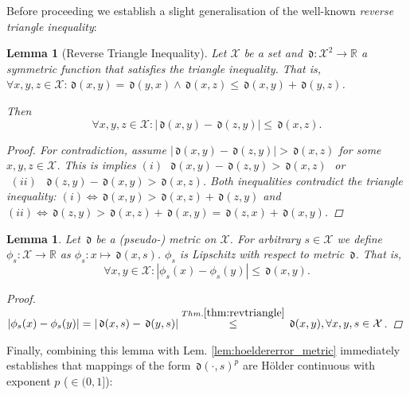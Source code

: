 \documentclass{article} %
\newtheorem{lem}[thm]{Lemma}
\theoremstyle{definition}
\theoremstyle{remark}
\newcommand{\abs}[1]{\left\vert#1\right\vert}
\newcommand{\Real}{\mathbb R}
\newcommand{\inspace}{\ensuremath{ \mathcal X}}
\newcommand{\metric}{\, \mathfrak{d}} %
\begin{document}
Before proceeding we establish a slight generalisation of the well-known \textit{reverse triangle inequality}:

\begin{lem}[Reverse Triangle Inequality] \label{thm:revtriangle}
Let  $\inspace$ be a set and $\metric : \inspace^2 \to \Real$ a symmetric function that satisfies the triangle inequality. 
That is,  $\forall x,y,z \in \inspace: \metric (x,y) = \metric(y,x) \wedge \metric(x,z) \leq \metric(x,y) + \metric(y,z)$.

Then \[\forall x,y,z \in \inspace: \abs{\metric(x,y) - \metric(z,y)} \leq \metric(x,z).\]
\begin{proof}
For contradiction, assume 
$\abs{\metric(x,y) - \metric(z,y)}>\metric(x,z)$ for some $x,y,z \in \inspace$.
This is implies  
$
(i)\,\,\, \metric(x,y) - \metric(z,y)>\metric(x,z) 
\, \, $  or  $
\,\,  (ii) \,\,\,\, \metric(z,y)-\metric(x,y) >\metric(x,z)$.
Both inequalities contradict the triangle inequality:
$(i) \Leftrightarrow \metric(x,y)  >\metric(x,z) +\metric(z,y) $ and 
$(ii) \Leftrightarrow  \metric(z,y) > \metric(x,z) + \metric(x,y) =  \metric(z,x) + \metric(x,y)$.

\end{proof}
\end{lem}


\begin{lem}
Let $\metric$ be a (pseudo-) metric on $\inspace$. For arbitrary $s \in \inspace $ we define $\phi_s: \inspace \to \Real $ as $\phi_s: x \mapsto \metric (x,s) $.
$\phi_s $ is Lipschitz with respect to metric $\metric$. That is, \[\forall x,y \in \inspace : \abs{\phi_s(x) - \phi_s(y) } \leq \metric (x,y). \]
\begin{proof}
$\abs{\phi_s(x) - \phi_s(y)} = \abs{\metric(x,s) - \metric(y,s)} \stackrel{Thm. \ref{thm:revtriangle}} {\leq} \metric(x,y), \forall x,y,s \in \inspace $.
\end{proof}
\end{lem}
Finally, combining this lemma with Lem. \ref{lem:hoeldererror_metric} immediately establishes that mappings of the form $\metric(\cdot,s)^p$ are H\"older continuous with exponent $p$ ($\in (0,1]$):
\end{document}
